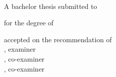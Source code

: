 \begin{titlepage}
    \begin{center}
        \large
        \begingroup
        \endgroup

        \hfill

        \vfill

        \begingroup
            \spacedallcaps{\myTitleOnTitlePageLineOne}\\
            \spacedallcaps{\myTitleOnTitlePageLineTwo}
        \endgroup

        \vfill

        \begingroup
            A bachelor thesis submitted to\\
        \endgroup
        
        \vfill

        \begingroup
            for the degree of\\
        \endgroup

        \vfill

        \vfill

        \begingroup
            accepted on the recommendation of\\
            \myProfA, examiner\\
            \myProfB, co-examiner\\
            \mySupervisor, co-examiner
        \endgroup

        \vfill

        \myTime

        \vfill                      

    \end{center}  
\end{titlepage}

